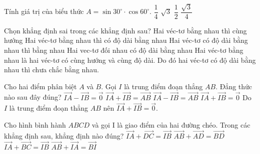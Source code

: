 \begin{ex}%
Tính giá trị của biểu thức $A=\sin 30^\circ \cdot \cos 60^\circ$.
\choice
{\True $\dfrac{1}{4}$}
{$\sqrt{3}$}
{$\dfrac{1}{2}$}
{$\dfrac{\sqrt{3}}{4}$}
\end{ex}

\begin{ex}%
Chọn khẳng định sai trong các khẳng định sau?
\choice
{ Hai véc-tơ bằng nhau thì cùng hướng}
{Hai véc-tơ bằng nhau thì có độ dài bằng nhau}
{\True Hai véc-tơ có độ dài bằng nhau thì bằng nhau}
{Hai vec-tơ đối nhau có độ dài bằng nhau}
\loigiai
{ Hai véc-tơ bằng nhau là hai véc-tơ có cùng hướng và cùng độ dài. Do đó hai véc-tơ có độ dài bằng nhau thì chưa chắc bằng nhau.}
\end{ex}

\begin{ex}%
Cho hai điểm phân biệt $A$ và $B$. Gọi $I$ là trung điểm đoạn thẳng $AB$. Đẳng thức nào sau đây đúng?
\choice
{$\overrightarrow{IA}-\overrightarrow{IB}=\overrightarrow{0}$}
{$\overrightarrow{IA}+\overrightarrow{IB}=\overrightarrow{AB}$}
{$\overrightarrow{IA}-\overrightarrow{IB}=\overrightarrow{AB}$}
{\True $\overrightarrow{IA}+\overrightarrow{IB}=\overrightarrow{0}$}
\loigiai
{
Do  $I$ là trung điểm đoạn thẳng $AB$ nên $\overrightarrow{IA}+\overrightarrow{IB}=\overrightarrow{0}$.
}
\end{ex}

\begin{ex}%
Cho hình bình hành $ABCD$ và gọi I là giao điểm của hai đường chéo. Trong các khẳng định sau, khẳng định nào đúng?
\choice
{\True $\overrightarrow{IA}+\overrightarrow{DC}=\overrightarrow{IB}$}
{$\overrightarrow{AB}+\overrightarrow{AD}=\overrightarrow{BD}$}
{$\overrightarrow{IA}+\overrightarrow{BC}=\overrightarrow{IB}$}
{$\overrightarrow{AB}+\overrightarrow{IA}=\overrightarrow{BI}$}
\end{ex}

